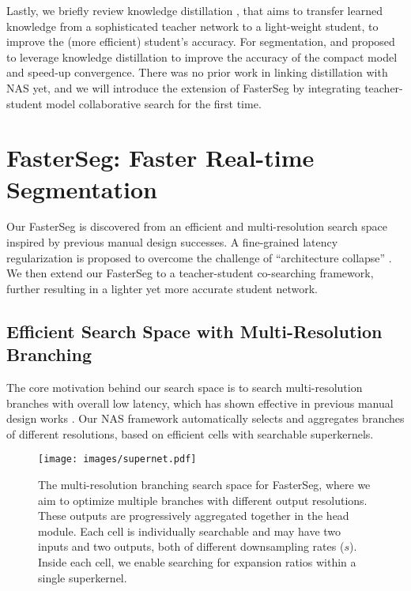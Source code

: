 \documentclass{article} \usepackage{iclr2020_conference,times}
\begin{document}
Lastly, we briefly review knowledge distillation \citep{hinton2015distilling}, that aims to transfer learned knowledge from a sophisticated teacher network to a light-weight student, to improve the (more efficient) student's accuracy. For segmentation, \citet{liu2019structured} and \citet{nekrasov2019fast} proposed to leverage knowledge distillation to improve the accuracy of the compact model and speed-up convergence. There was no prior work in linking distillation with NAS yet, and we will introduce the extension of FasterSeg by integrating teacher-student model collaborative search for the first time.\vspace{-0.5em}




\section{FasterSeg: Faster Real-time Segmentation}\vspace{-1em}

Our FasterSeg is discovered from an efficient and multi-resolution search space inspired by previous manual design successes. 
A fine-grained latency regularization is proposed to overcome the challenge of ``architecture collapse'' \citep{cheng2018instanas}. We then extend our FasterSeg to a teacher-student co-searching framework, further resulting in a lighter yet more accurate student network. \vspace{-1em}




\subsection{Efficient Search Space with Multi-Resolution Branching}\vspace{-0.5em}



The core motivation behind our search space is to search multi-resolution branches with overall low latency, which has shown effective in previous manual design works \citep{zhao2018icnet,yu2018bisenet}. Our NAS framework automatically selects and aggregates branches of different resolutions, based on efficient cells with searchable superkernels. \vspace{-1.3em}

\begin{figure}[ht]
\texttt{[image: images/supernet.pdf]}
\centering \vspace{-1em}
\caption{The multi-resolution branching search space for FasterSeg, where we aim to optimize multiple branches with different output resolutions. These outputs are progressively aggregated together in the head module. Each cell is individually searchable and may have two inputs and two outputs, both of different downsampling rates ($s$). Inside each cell, we enable searching for expansion ratios within a single superkernel. 
}
\label{fig:supernet}
\end{figure}
\end{document}
